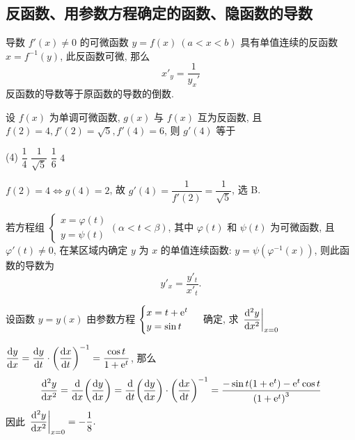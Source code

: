 \subsection{反函数、用参数方程确定的函数、隐函数的导数}

\begin{theorem}[反函数的导数]
    导数 $f'(x)\neq0$ 的可微函数 $y=f(x)~  (a<x<b)$ 具有单值连续的反函数 $x=f^{-1}(y)$,
    此反函数可微, 那么 $$x'_y=\dfrac{1}{y_x'}$$ 反函数的导数等于原函数的导数的倒数.
\end{theorem}

\begin{example}
    设 $f(x)$ 为单调可微函数, $g(x)$ 与 $f(x)$ 互为反函数, 且 $f(2)=4,f'(2)=\sqrt{5},f'(4)=6$, 则 $g'(4)$ 等于
    \begin{tasks}(4)
        \task $\dfrac{1}{4}$
        \task $\dfrac{1}{\sqrt{5}}$
        \task $\dfrac{1}{6}$
        \task $4$
    \end{tasks}
\end{example}
\begin{solution}
    $f(2)=4\Leftrightarrow g(4)=2$, 故 $g'(4)=\dfrac{1}{f'(2)}=\dfrac{1}{\sqrt{5}}$, 选 B.
\end{solution}

\begin{theorem}[用参数方程确定的函数的导数]
    若方程组
    $\begin{cases}
            x=\varphi(t) \\
            y=\psi (t)
        \end{cases}(\alpha<t<\beta)$, 其中 $\varphi(t)$ 和 $\psi(t)$ 为可微函数, 且 $\varphi'(t)\neq0$,
    在某区域内确定 $y$ 为 $x$ 的单值连续函数: $y=\psi\left(\varphi^{-1}(x)\right)$, 则此函数的导数为
    $$y'_x=\dfrac{y'_t}{x'_t}.$$
\end{theorem}

\begin{example}[2017 数二]
    设函数 $y=y(x)$ 由参数方程 $\begin{cases}
            x=t+\mathrm{e}^t \\y=\sin t
        \end{cases}$ 确定, 求 $\displaystyle\eval{\dv[2]{y}{x}}_{x=0}$
\end{example}
\begin{solution}
    $\displaystyle\dv{y}{x}=\dv{y}{t}\cdot\qty(\dv{x}{t})^{-1}=\dfrac{\cos t}{1+\mathrm{e}^t}$, 那么
    $$\dv[2]{y}{x}=\dv{x}\qty(\dv{y}{x})=\dv{t}\qty(\dv{y}{x})\cdot\qty(\dv{x}{t})^{-1}=\dfrac{-\sin t\qty(1+\mathrm{e}^t)-\mathrm{e}^t\cos t}{\qty(1+\mathrm{e}^t)^3}$$
    因此 $\displaystyle\eval{\dv[2]{y}{x}}_{x=0}=-\dfrac{1}{8}.$
\end{solution}

